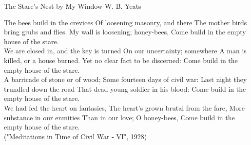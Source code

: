\begin{poem}
{The Stare's Nest by My Window}
{W. B. Yeats}

 The bees build in the crevices
 Of loosening masonry, and there
 The mother birds bring grubs and flies.
 My wall is loosening; honey-bees,
 Come build in the empty house of the stare.\\
 
 We are closed in, and the key is turned
 On our uncertainty; somewhere
 A man is killed, or a house burned.
 Yet no clear fact to be discerned:
 Come build in the empty house of the stare.\\
 
 A barricade of stone or of wood;
 Some fourteen days of civil war:
 Last night they trundled down the road
 That dead young soldier in his blood:
 Come build in the empty house of the stare.\\
 
 We had fed the heart on fantasies,
 The heart's grown brutal from the fare,
 More substance in our enmities
 Than in our love; O honey-bees,
 Come build in the empty house of the stare.\\

           ("Meditations in Time of Civil War - VI", 1928)
 \end{poem}

